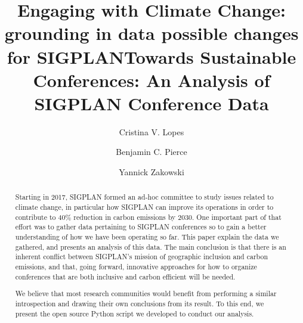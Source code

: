 \documentclass[review, screen]{acmart}
\title{Engaging with Climate Change: grounding in data possible changes for SIGPLAN}
\newif\ifopinions\opinionstrue   %
\begin{document}
\title{Towards Sustainable Conferences: An Analysis of SIGPLAN Conference Data}

\author{Cristina V. Lopes}

\author{Benjamin C. Pierce}

\author{Yannick Zakowski}

\begin{abstract}

Starting in 2017, SIGPLAN formed an ad-hoc committee to study issues related to
climate change, in particular how SIGPLAN can improve its operations in order to
contribute to 40\% reduction in carbon emissions by 2030. One important part of
that effort was to gather data pertaining to SIGPLAN conferences so to gain a
better understanding of how we have been operating so far. This paper explain
the data we gathered, and presents an analysis of this data. The main conclusion
is that there is an inherent conflict between SIGPLAN's mission of geographic
inclusion and carbon emissions, and that, going forward, innovative approaches
for how to organize conferences that are both inclusive and carbon efficient
will be needed. 

We believe that most research communities would benefit from performing a
similar introspection and drawing their own conclusions from its result. To
this end, we present the open source Python script we developed to conduct
our analysis.

\end{abstract}


\maketitle






\ifopinions\fi




\end{document}
